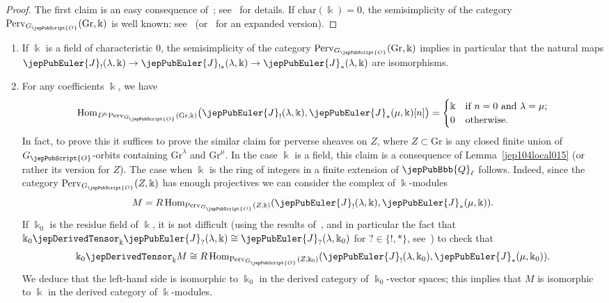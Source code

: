 \begin{proof}
The first claim is an easy consequence of~\cite[Prop.~10.1(b)]{jep104ref36}; see~\cite[Prop.~1.12.4]{jep104ref11} for details.
If $\mathrm{char}(\Bbbk)=0$, the semisimplicity of the category $\mathrm{Perv}_{G_{\jepPubScript{O}}}(\mathrm{Gr}, \Bbbk)$ is well known: see~\cite[Prop.~1]{jep104ref27} (or~\cite[\S 1.4]{jep104ref11} for an expanded version).
\end{proof}

\begin{rmk}
\label{jep104local024}
\begin{enumerate}
\item
\label{jep104local014}
If $\Bbbk$ is a field of characteristic $0$, the semisimplicity of the category $\mathrm{Perv}_{G_{\jepPubScript{O}}}(\mathrm{Gr}, \Bbbk)$ implies in particular that the natural maps $\jepPubEuler{J}_!(\lambda,\Bbbk) \to \jepPubEuler{J}_{!*}(\lambda,\Bbbk) \to \jepPubEuler{J}_*(\lambda,\Bbbk)$ are isomorphisms.
\item
\label{jep104local011}
 For any coefficients $\Bbbk$, we have
 \[
  \operatorname{Hom}_{D^{\mathrm{b}} \mathrm{Perv}_{G_{\jepPubScript{O}}}(\mathrm{Gr},\Bbbk)} \bigl( \jepPubEuler{J}_!(\lambda,\Bbbk), \jepPubEuler{J}_*(\mu,\Bbbk)[n] \bigr)=
  \begin{cases}
   \Bbbk & \text{if $n=0$ and $\lambda=\mu$;} \\
    0 & \text{otherwise.}
\end{cases}
 \]
In fact, to prove this it suffices to prove the similar claim for perverse sheaves on $Z$, where $Z \subset \mathrm{Gr}$ is any closed finite union of $G_{\jepPubScript{O}}$-orbits containing $\mathrm{Gr}^\lambda$ and $\mathrm{Gr}^\mu$. In the case $\Bbbk$ is a field, this claim is a consequence of Lemma~\ref{jep104local015} (or rather its version for $Z$). The case when $\Bbbk$ is the ring of integers in a finite extension of $\jepPubBbb{Q}_\ell$ follows. Indeed, since the category $\mathrm{Perv}_{G_{\jepPubScript{O}}}(Z,\Bbbk)$ has enough projectives we can consider the complex of $\Bbbk$-modules
\[
 M=R\operatorname{Hom}_{\mathrm{Perv}_{G_{\jepPubScript{O}}}(Z,\Bbbk)}(\jepPubEuler{J}_!(\lambda,\Bbbk), \jepPubEuler{J}_*(\mu,\Bbbk)).
\]
If $\Bbbk_0$ is the residue field of $\Bbbk$, it is not difficult (using the results of~\cite[\S 8 \& \S 10]{jep104ref36}, and in particular the fact that $\Bbbk_0 \jepDerivedTensor_\Bbbk \jepPubEuler{J}_?(\lambda,\Bbbk) \cong \jepPubEuler{J}_?(\lambda,\Bbbk_0)$ for $? \in \{!,*\}$, see~\cite[Prop.~8.1]{jep104ref36}) to check that
\[
 \Bbbk_0 \jepDerivedTensor_\Bbbk M \cong R\operatorname{Hom}_{\mathrm{Perv}_{G_{\jepPubScript{O}}}(Z,\Bbbk_0)}(\jepPubEuler{J}_!(\lambda,\Bbbk_0), \jepPubEuler{J}_*(\mu,\Bbbk_0)).
\]
We deduce that the left-hand side is isomorphic to $\Bbbk_0$ in the derived category of $\Bbbk_0$-vector spaces; this implies that $M$ is isomorphic to $\Bbbk$ in the derived category of $\Bbbk$-modules.
\end{enumerate}
\end{rmk}

